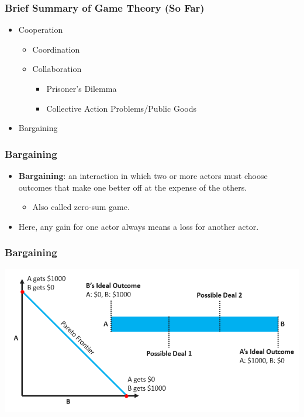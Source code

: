 \documentclass{beamer}
\begin{document}
\begin{frame} 
	\frametitle{\LARGE{Brief Summary of Game Theory (So Far)}}
	\begin{itemize}
		\item Cooperation
		\begin{itemize}
			\item Coordination
			\item Collaboration
			\begin{itemize}
				\item Prisoner's Dilemma
				\item Collective Action Problems/Public Goods
			\end{itemize}
		\end{itemize}
		\item Bargaining
	\end{itemize}
\end{frame}

\begin{frame} 
	\frametitle{\LARGE{Bargaining}}
	\begin{itemize}
	\item \textbf{Bargaining}: an interaction in which two or more actors must choose outcomes that make one better off at the expense of the others.
	\begin{itemize}
		\item Also called zero-sum game.
	\end{itemize}
	\item Here, any gain for one actor always means a loss for another actor.
		\end{itemize}
\end{frame}

\begin{frame} 
	\frametitle{\LARGE{Bargaining}}
	\centering
	\includegraphics[width=\textwidth,height=0.9\textheight,keepaspectratio]{Bargaining.png}
\end{frame}
\end{document}
